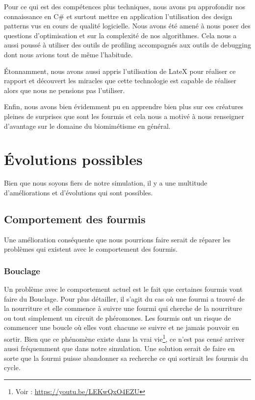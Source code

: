 \documentclass{EPUProjetDi}
\begin{document}
Pour ce qui est des compétences plus techniques, nous avons pu approfondir nos connaissance en C\# et surtout mettre en application
l'utilisation des design patterns vus en cours de qualité logicielle. Nous avons été amené à nous poser des questions d'optimisation
et sur la complexité de nos algorithmes. Cela nous a aussi poussé à utiliser des outils de profiling accompagnés aux outils de debugging dont nous
avions tout de même l'habitude.

Étonnamment, nous avons aussi appris l'utilisation de LateX pour réaliser ce rapport et découvert les miracles que cette technologie est capable 
de réaliser alors que nous ne pensions pas l'utiliser.

Enfin, nous avons bien évidemment pu en apprendre bien plus sur ces créatures pleines de surprises que sont les fourmis et cela nous a motivé 
à nous renseigner d'avantage sur le domaine du biomimétisme en général.


\section{Évolutions possibles}

Bien que nous soyons fiers de notre simulation, il y a une multitude d'améliorations et d'évolutions qui sont possibles.

\subsection{Comportement des fourmis}

Une amélioration conséquente que nous pourrions faire serait de réparer les problèmes qui existent avec le comportement des fourmis.

\subsubsection{Bouclage}

Un problème avec le comportement actuel est le fait que certaines fourmis vont faire du Bouclage. Pour plus détailler, il s'agit du cas
où une fourmi a trouvé de la nourriture et elle commence à suivre une fourmi qui cherche de la nourriture ou tout simplement un circuit de phéromones. 
Les fourmis ont un risque de commencer une boucle où elles vont chacune se suivre et ne jamais pouvoir en sortir.
Bien que ce phénomène existe dans la vrai vie\footnote{Voir : \url{https://youtu.be/LEKwQxO4EZU}}, ce n'est pas censé arriver aussi fréquemment que dans notre simulation.
Une solution serait de faire en sorte que la fourmi puisse abandonner sa recherche ce qui sortirait les fourmis du cycle.
\end{document}
